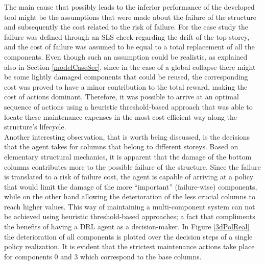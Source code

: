 The main cause that possibly leads to the inferior performance of the developed tool might be the assumptions that were made about the failure of the structure and subsequently the cost related to the risk of failure. For the case study the failure was defined through an \gls{SLS} check regarding the drift of the top storey, and the cost of failure was assumed to be equal to a total replacement of all the components. Even though such an assumption could be realistic, as explained also in Section \ref{modelCaseSec}, since in the case of a global collapse there might be some lightly damaged components that could be reused, the corresponding cost was proved to have a minor contribution to the total reward, making the cost of actions dominant. Therefore, it was possible to arrive at an optimal sequence of actions using a heuristic threshold-based approach that was able to locate these maintenance expenses in the most cost-efficient way along the structure's lifecycle.\\

Another interesting observation, that is worth being discussed, is the decisions that the agent takes for columns that belong to different storeys. Based on elementary structural mechanics, it is apparent that the damage of the bottom columns contributes more to the possible failure of the structure. Since the failure is translated to a risk of failure cost, the agent is capable of arriving at a policy that would limit the damage of the more ``important'' (failure-wise) components, while on the other hand allowing the deterioration of the less crucial columns to reach higher values. This way of maintaining a multi-component system can not be achieved using heuristic threshold-based approaches; a fact that compliments the benefits of having a \gls{DRL} agent as a decision-maker. In Figure \ref{3dPolReal} the deterioration of all components is plotted over the decision steps of a single policy realization. It is evident that the strictest maintenance actions take place for components $0$ and $3$ which correspond to the base columns.


